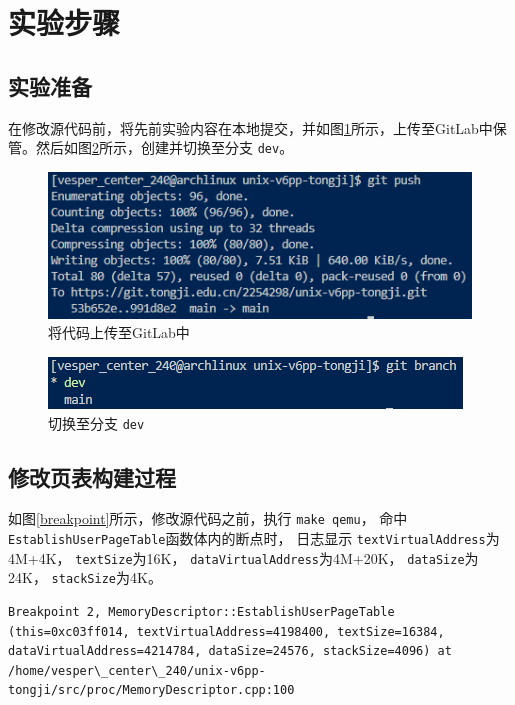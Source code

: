 \section{实验步骤}
\subsection{实验准备}
在修改源代码前，将先前实验内容在本地提交，并如图\ref{push}所示，上传至GitLab中保管。然后如图\ref{dev}所示，创建并切换至分支 \texttt{dev}。

\begin{figure}[!htbp]
    \centering
    \includegraphics[scale=1]{images/push.png}
    \caption{将代码上传至GitLab中}\label{push}
\end{figure}

\begin{figure}[!htbp]
    \centering
    \includegraphics[scale=1]{images/dev.png}
    \caption{切换至分支 \texttt{dev}}\label{dev}
\end{figure}


\subsection{修改页表构建过程}
如图\ref{breakpoint}所示，修改源代码之前，执行 \texttt{make qemu}， 命中\texttt{EstablishUserPageTable}函数体内的断点时，
日志显示 \texttt{textVirtualAddress}为4M+4K， \texttt{textSize}为16K， \texttt{dataVirtualAddress}为4M+20K， \texttt{dataSize}为24K， \texttt{stackSize}为4K。

\begin{Verbatim}[frame=single,fontsize=\small,commandchars=\\\{\}]
Breakpoint 2, MemoryDescriptor::EstablishUserPageTable (this=0xc03ff014, textVirtualAddress=4198400, textSize=16384, dataVirtualAddress=4214784, dataSize=24576, stackSize=4096) at /home/vesper\_center\_240/unix-v6pp-tongji/src/proc/MemoryDescriptor.cpp:100
\end{Verbatim}
\label{breakpoint}

